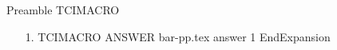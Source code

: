 Preamble
TCIMACRO
\begin{enumerate}
\item[1.]
TCIMACRO
ANSWER
bar-pp.tex answer 1
EndExpansion
\end{enumerate}
